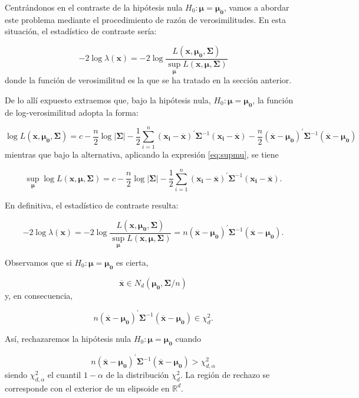 \documentclass[
  a4paper,
  oneside]{scrbook}
\theoremstyle{definition}
\theoremstyle{definition}
\theoremstyle{definition}
\theoremstyle{definition}
\theoremstyle{remark}
\begin{document}
Centrándonos en el contraste de la hipótesis nula
\(H_0:\bm{\mu}=\bm{\mu_0}\), vamos a abordar este problema mediante el
procedimiento de razón de verosimilitudes. En esta situación, el
estadístico de contraste sería:

\[-2\log \lambda(\bm{x})=-2\log \frac{L(\bm{x},\bm{\mu_0},\bm\Sigma)}{\sup_{\bm{\mu}} L(\bm{x},\bm{\mu},\bm\Sigma)}\]
donde la función de verosimilitud es la que se ha tratado en la sección
anterior.

De lo allí expuesto extraemos que, bajo la hipótesis nula,
\(H_0: \bm{\mu}=\bm{\mu_0}\), la función de log-verosimilitud adopta la
forma:

\[\log L(\bm{x},\bm{\mu_0},\bm\Sigma) = c - \frac{n}{2} \log |\bm\Sigma |
-\frac{1}{2} \sum_{i=1}^n \left(\bm{x_i}-\overline{\bm{x}}\right)^\prime{}\bm\Sigma^{-1} \left(\bm{x_i}-\overline{\bm{x}}\right)
-\frac{n}{2}  \left(\overline{\bm{x}}-\bm{\mu_0}\right)^\prime{}\bm\Sigma^{-1} \left(\overline{\bm{x}}-\bm{\mu_0}\right)\]
mientras que bajo la alternativa, aplicando la expresión \eqref{eq:supmu}, se tiene

\[\sup_{\bm{\mu}}\log L(\bm{x},\bm{\mu},\bm\Sigma) = c - \frac{n}{2} \log |\bm\Sigma|
-\frac{1}{2} \sum_{i=1}^n \left(\bm{x_i}-\overline{\bm{x}}\right)^\prime{}\bm\Sigma^{-1} \left(\bm{x_i}-\overline{\bm{x}}\right).\]

En definitiva, el estadístico de contraste resulta:

\[-2\log \lambda(\bm{x})=-2\log \frac{L(\bm{x},\bm{\mu_0},\bm\Sigma)}{\sup_{\bm{\mu}} L(\bm{x},\bm{\mu},\bm\Sigma)}
=n\left(\overline{\bm{x}}-\bm{\mu_0}\right)^\prime{}\bm\Sigma^{-1} \left(\overline{\bm{x}}-\bm{\mu_0}\right).\]

Observamos que si \(H_0:\bm{\mu}=\bm{\mu_0}\) es cierta,

\[\overline{\bm{x}}\in N_d\left(\bm{\mu_0},\bm\Sigma/n\right)\] y, en
consecuencia,

\[n\left(\overline{\bm{x}}-\bm{\mu_0}\right)^\prime{}\bm\Sigma^{-1} \left(\overline{\bm{x}}-\bm{\mu_0}\right)\in\chi_d^2.\]

Así, rechazaremos la hipótesis nula \(H_0:\bm{\mu}=\bm{\mu_0}\) cuando

\[\label{testchi}
n\left(\overline{\bm{x}}-\bm{\mu_0}\right)^\prime{}\bm\Sigma^{-1} \left(\overline{\bm{x}}-\bm{\mu_0}\right)>\chi_{d,\alpha}^2\]
siendo \(\chi_{d,\alpha}^2\) el cuantil \(1-\alpha\) de la distribución
\(\chi_d^2\). La región de rechazo se corresponde con el exterior de un
elipsoide en \(\mathbb{R}^d\).
\end{document}
